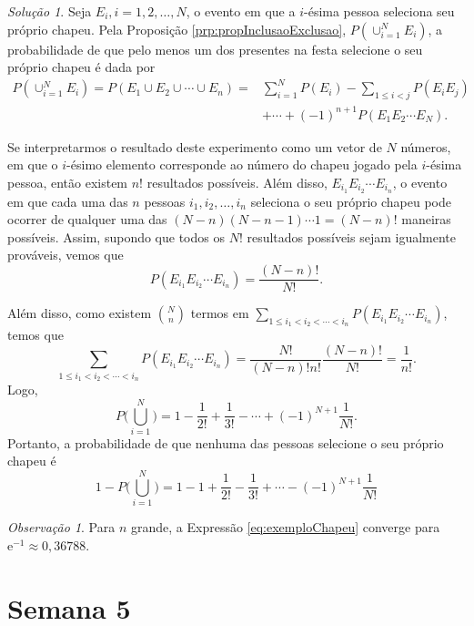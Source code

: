 \documentclass[]{book}
\theoremstyle{definition}
\theoremstyle{definition}
\theoremstyle{definition}
\theoremstyle{remark}
\newtheorem*{remark}{Observação}
\newtheorem*{solution}{Solução}
\begin{document}
\begin{solution}
\iffalse{} {Solução. } \fi{}Seja \(E_i, i=1,2,\ldots,N\), o evento em que a \(i\)-ésima pessoa seleciona seu próprio chapeu.
Pela Proposição \ref{prp:propInclusaoExclusao}, \(P(\cup_{i=1}^{N}E_i)\), a probabilidade de que pelo menos um dos presentes na festa selecione o seu próprio chapeu é dada por
\begin{align}
P(\cup_{i=1}^{N}E_i)=P(E_1\cup E_2 \cup\cdots\cup E_n) =& \sum_{i=1}^{N}P(E_i) - \sum_{1\leq i <j}P(E_i E_j) \\ &+ \cdots +(-1)^{n+1}P(E_1 E_2 \cdots E_N).
\end{align}

Se interpretarmos o resultado deste experimento como um vetor de \(N\) números, em que o \(i\)-ésimo elemento corresponde ao número do chapeu jogado pela \(i\)-ésima pessoa, então existem \(n!\) resultados possíveis.
Além disso, \(E_{i_1}E_{i_2}\cdots E_{i_n}\), o evento em que cada uma das \(n\) pessoas
\(i_1, i_2, \ldots, i_n\) seleciona o seu próprio chapeu pode ocorrer de qualquer uma das \((N-n)(N-n-1)\cdots 1=(N-n)!\) maneiras possíveis.
Assim, supondo que todos os \(N!\) resultados possíveis sejam igualmente prováveis, vemos que
\[P(E_{i_1}E_{i_2}\cdots E_{i_n}) = \frac{(N-n)!}{N!}.\]

Além disso, como existem \({N \choose n}\) termos em \(\sum_{1\leq i_1<i_2 < \cdots < i_n}P(E_{i_1}E_{i_2}\cdots E_{i_n})\), temos que
\[\sum_{1\leq i_1<i_2 < \cdots < i_n}P(E_{i_1}E_{i_2}\cdots E_{i_n}) = \frac{N!}{(N-n)!n!}\frac{(N-n)!}{N!} = \frac{1}{n!}.\]
Logo,
\[P\Bigg(\bigcup_{i=1}^{N}\Bigg) = 1 - \frac{1}{2!} + \frac{1}{3!} - \cdots + (-1)^{N+1}\frac{1}{N!}.\]
Portanto, a probabilidade de que nenhuma das pessoas selecione o seu próprio chapeu é
\begin{equation}
1 - P\Bigg(\bigcup_{i=1}^{N}\Bigg) = 1 - 1 + \frac{1}{2!} - \frac{1}{3!} + \cdots - (-1)^{N+1}\frac{1}{N!}
\label{eq:exemploChapeu}
\end{equation}
\end{solution}

\begin{remark}
\iffalse{} {Observação. } \fi{}Para \(n\) grande, a Expressão \eqref{eq:exemploChapeu} converge para \(\mathrm{e}^{-1}\approx 0{,}36788\).
\end{remark}

\hypertarget{sem5}{%
\chapter{Semana 5}\label{sem5}}
\end{document}
